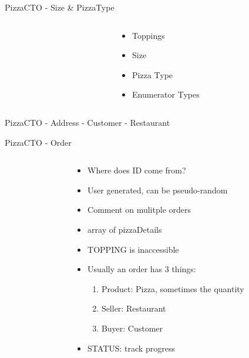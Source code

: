 \documentclass[pdf,table]{beamer}
\begin{document}
\begin{frame}{Pizza}{CTO - Size \& PizzaType}
	\begin{columns}[T]
		\begin{column}{0.55\textwidth}
			
		\end{column}
		\begin{column}{0.35\textwidth}
			\begin{itemize}
				\item Toppings
				\item Size	
				\item Pizza Type
				\item Enumerator Types
			\end{itemize}
		\end{column}
	\end{columns}	
\end{frame}

\begin{frame}{Pizza}{CTO - Address - Customer - Restaurant}
			
\end{frame}

\begin{frame}{Pizza}{CTO - Order }
	\begin{columns}[T]
		\begin{column}{0.35\textwidth}
			
		\end{column}
		\begin{column}{0.55\textwidth}
			\begin{itemize}
				\item Where does ID come from?
				\item<2-> User generated, can be pseudo-random
				\item<2-> Comment on mulitple orders
				\item<2-> array of pizzaDetails
				\item<2-> TOPPING is inaccessible
				\item<2-> Usually an order has 3 things:
					\begin{enumerate}
						\item<3-> Product: Pizza, sometimes the quantity
						\item<3-> Seller: Restaurant
						\item<3-> Buyer: Customer
					\end{enumerate}
				\item<3-> STATUS: track progress
			\end{itemize}
		\end{column}
	\end{columns}	
\end{frame}
\end{document}
